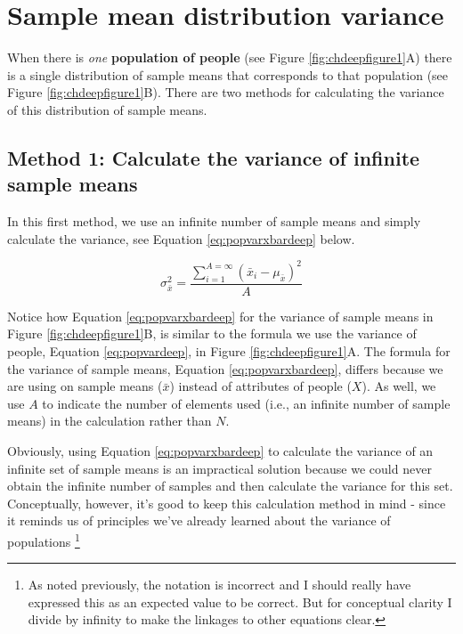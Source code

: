 \documentclass[
]{krantz}
\begin{document}
\hypertarget{sample-mean-distribution-variance}{%
\section{Sample mean distribution variance}\label{sample-mean-distribution-variance}}

When there is \emph{one} \textbf{population of people} (see Figure \ref{fig:chdeepfigure1}A) there is a single distribution of sample means that corresponds to that population (see Figure \ref{fig:chdeepfigure1}B). There are two methods for calculating the variance of this distribution of sample means.

\hypertarget{method-1-calculate-the-variance-of-infinite-sample-means}{%
\subsection{Method 1: Calculate the variance of infinite sample means}\label{method-1-calculate-the-variance-of-infinite-sample-means}}

In this first method, we use an infinite number of sample means and simply calculate the variance, see Equation \eqref{eq:popvarxbardeep} below.

\begin{equation} 
\sigma_{\bar{x}}^2 = \frac{\sum_{i=1}^{A=\infty}{(\bar{x}_i - \mu_{\bar{x}})^2}}{A}
      \label{eq:popvarxbardeep}
\end{equation}

Notice how Equation \eqref{eq:popvarxbardeep} for the variance of sample means in Figure \ref{fig:chdeepfigure1}B, is similar to the formula we use the variance of people, Equation \eqref{eq:popvardeep}, in Figure \ref{fig:chdeepfigure1}A. The formula for the variance of sample means, Equation \eqref{eq:popvarxbardeep}, differs because we are using on sample means (\(\bar{x}\)) instead of attributes of people (\(X\)). As well, we use \(A\) to indicate the number of elements used (i.e., an infinite number of sample means) in the calculation rather than \(N\).

Obviously, using Equation \eqref{eq:popvarxbardeep} to calculate the variance of an infinite set of sample means is an impractical solution because we could never obtain the infinite number of samples and then calculate the variance for this set. Conceptually, however, it's good to keep this calculation method in mind - since it reminds us of principles we've already learned about the variance of populations \footnote{As noted previously, the notation is incorrect and I should really have expressed this as an expected value to be correct. But for conceptual clarity I divide by infinity to make the linkages to other equations clear.}
\end{document}
